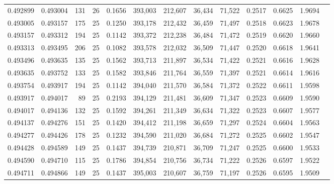 \begin{tabular}{rrrrrrrrrrrrr}
0.492899 & 0.493004 &   131 &  26 &                                     0.1656 & 393,003 & 212,607 &  36,434 &  71,522 & 0.2517 & 0.6625 & 1.9694 \\
0.493005 & 0.493157 &   175 &  25 &                                     0.1250 & 393,178 & 212,432 &  36,459 &  71,497 & 0.2518 & 0.6623 & 1.9678 \\
0.493157 & 0.493312 &   194 &  25 &                                     0.1142 & 393,372 & 212,238 &  36,484 &  71,472 & 0.2519 & 0.6620 & 1.9660 \\
0.493313 & 0.493495 &   206 &  25 &                                     0.1082 & 393,578 & 212,032 &  36,509 &  71,447 & 0.2520 & 0.6618 & 1.9641 \\
0.493496 & 0.493635 &   135 &  25 &                                     0.1562 & 393,713 & 211,897 &  36,534 &  71,422 & 0.2521 & 0.6616 & 1.9628 \\
0.493635 & 0.493752 &   133 &  25 &                                     0.1582 & 393,846 & 211,764 &  36,559 &  71,397 & 0.2521 & 0.6614 & 1.9616 \\
0.493754 & 0.493917 &   194 &  25 &                                     0.1142 & 394,040 & 211,570 &  36,584 &  71,372 & 0.2522 & 0.6611 & 1.9598 \\
0.493917 & 0.494017 &    89 &  25 &                                     0.2193 & 394,129 & 211,481 &  36,609 &  71,347 & 0.2523 & 0.6609 & 1.9590 \\
0.494017 & 0.494136 &   132 &  25 &                                     0.1592 & 394,261 & 211,349 &  36,634 &  71,322 & 0.2523 & 0.6607 & 1.9577 \\
0.494137 & 0.494276 &   151 &  25 &                                     0.1420 & 394,412 & 211,198 &  36,659 &  71,297 & 0.2524 & 0.6604 & 1.9563 \\
0.494277 & 0.494426 &   178 &  25 &                                     0.1232 & 394,590 & 211,020 &  36,684 &  71,272 & 0.2525 & 0.6602 & 1.9547 \\
0.494428 & 0.494589 &   149 &  25 &                                     0.1437 & 394,739 & 210,871 &  36,709 &  71,247 & 0.2525 & 0.6600 & 1.9533 \\
0.494590 & 0.494710 &   115 &  25 &                                     0.1786 & 394,854 & 210,756 &  36,734 &  71,222 & 0.2526 & 0.6597 & 1.9522 \\
0.494711 & 0.494866 &   149 &  25 &                                     0.1437 & 395,003 & 210,607 &  36,759 &  71,197 & 0.2526 & 0.6595 & 1.9509 \\

\end{tabular}
